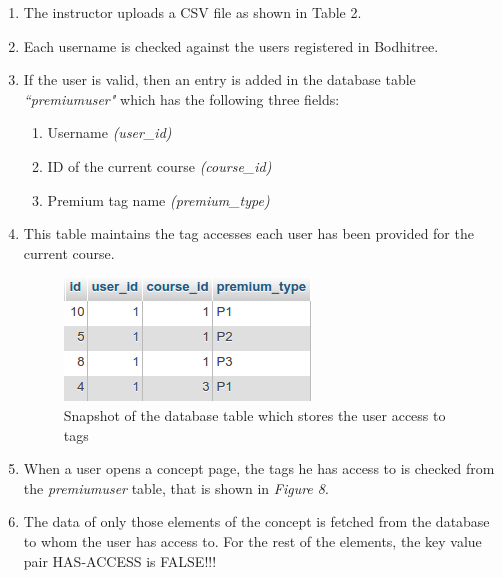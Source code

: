 \begin{enumerate}
	\item The instructor uploads a CSV file as shown in Table 2.
	\item Each username is checked against the users registered in Bodhitree.
	\item If the user is valid, then an entry is added in the database table \textit{``premiumuser"} which has the following three fields:
	\begin{enumerate}
		\item Username \textit{(user\_id)}
		\item ID of the current course \textit{(course\_id)}
		\item Premium tag name \textit{(premium\_type)}
	\end{enumerate}
	\item This table maintains the tag accesses each user has been provided for the current course.
	
	\begin{figure}[h]
	\centering
	\includegraphics[width=0.4\linewidth]{./media/premiumAccesses}
	\caption{Snapshot of the database table which stores the user access to tags}
	\label{fig:premiumAccesses}
	\end{figure}
	
	\item When a user opens a concept page, the tags he has access to is checked from the \textit{premiumuser} table, that is shown in \textit{Figure 8}.
	
	\item The data of only those elements of the concept is fetched from the database to whom the user has access to. For the rest of the elements, the key value pair HAS-ACCESS is FALSE!!!
	
\end{enumerate}


